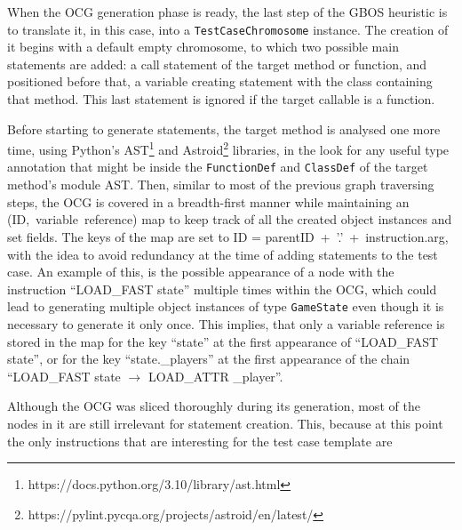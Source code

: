 \documentclass[%
  chapterprefix=false,%
  open=right,%
  twoside=true,%
  paper=a4,%
  logofile={Figures/logo.png},%
  thesistype=master,%
  UKenglish,%
]{se2thesis}
\newcommand{\classname}[1]{\texttt{#1}}
\begin{document}
When the OCG generation phase is ready, the last step of the GBOS heuristic is to translate it, in this case, into a \classname{TestCaseChromosome} instance.
The creation of it begins with a default empty chromosome, to which two possible main statements are added: a call statement of the target method or function, and positioned before that, a variable creating statement with the class containing that method.
This last statement is ignored if the target callable is a function.

Before starting to generate statements, the target method is analysed one more time, using Python's AST\footnote{https://docs.python.org/3.10/library/ast.html} and Astroid\footnote{https://pylint.pycqa.org/projects/astroid/en/latest/} libraries, in the look for any useful type annotation that might be inside the \classname{FunctionDef} and \classname{ClassDef} of the target method's module AST.\@ 
Then, similar to most of the previous graph traversing steps, the OCG is covered in a breadth-first manner while maintaining an (ID,~variable~reference) map to keep track of all the created object instances and set fields.
The keys of the map are set to ID = parentID~+~'.'~+~instruction.arg, with the idea  to avoid redundancy at the time of adding statements to the test case.
An example of this, is the possible appearance of a node with the instruction ``LOAD\_FAST state'' multiple times within the OCG, which could lead to generating multiple object instances of type \classname{GameState} even though it is necessary to generate it only once.
This implies, that only a variable reference is stored in the map for the key ``state'' at the first appearance of ``LOAD\_FAST state'', or for the key ``state.\_players'' at the first appearance of the chain ``LOAD\_FAST state \(\rightarrow\) LOAD\_ATTR \_player''.

Although the OCG was sliced thoroughly during its generation, most  of the nodes in it are still irrelevant for statement creation.
This, because at this point the only instructions that are interesting for the test case template are
\end{document}
